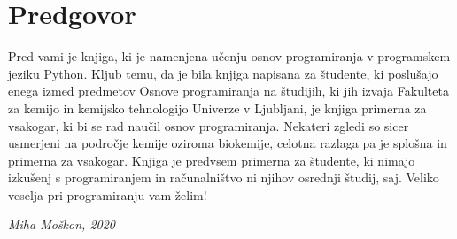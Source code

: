 \chapter*{Predgovor}

Pred vami je knjiga, ki je namenjena učenju osnov programiranja v programskem jeziku Python. Kljub temu, da je bila knjiga napisana za študente, ki poslušajo enega izmed predmetov Osnove programiranja na študijih, ki jih izvaja Fakulteta za kemijo in kemijsko tehnologijo Univerze v Ljubljani, je knjiga primerna za vsakogar, ki bi se rad naučil osnov programiranja. Nekateri zgledi so sicer usmerjeni na področje kemije oziroma biokemije, celotna razlaga pa je splošna in primerna za vsakogar. Knjiga je predvsem primerna za študente, ki nimajo izkušenj s programiranjem in računalništvo ni njihov osrednji študij, saj. Veliko veselja pri programiranju vam želim!

\begin{flushright}
\textit{Miha Moškon, 2020}
\end{flushright}
